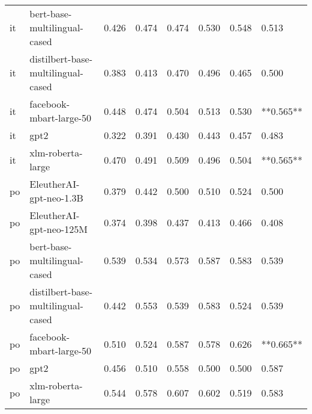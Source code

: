 \begin{tabular}{llllllll}
      it &       bert-base-multilingual-cased & 0.426 &                     0.474 &                 0.474 &                  0.530 &                                   0.548 &     0.513 \\
      it & distilbert-base-multilingual-cased & 0.383 &                     0.413 &                 0.470 &                  0.496 &                                   0.465 &     0.500 \\
      it &            facebook-mbart-large-50 & 0.448 &                     0.474 &                 0.504 &                  0.513 &                                   0.530 & **0.565** \\
      it &                               gpt2 & 0.322 &                     0.391 &                 0.430 &                  0.443 &                                   0.457 &     0.483 \\
      it &                  xlm-roberta-large & 0.470 &                     0.491 &                 0.509 &                  0.496 &                                   0.504 & **0.565** \\
      po &            EleutherAI-gpt-neo-1.3B & 0.379 &                     0.442 &                 0.500 &                  0.510 &                                   0.524 &     0.500 \\
      po &            EleutherAI-gpt-neo-125M & 0.374 &                     0.398 &                 0.437 &                  0.413 &                                   0.466 &     0.408 \\
      po &       bert-base-multilingual-cased & 0.539 &                     0.534 &                 0.573 &                  0.587 &                                   0.583 &     0.539 \\
      po & distilbert-base-multilingual-cased & 0.442 &                     0.553 &                 0.539 &                  0.583 &                                   0.524 &     0.539 \\
      po &            facebook-mbart-large-50 & 0.510 &                     0.524 &                 0.587 &                  0.578 &                                   0.626 & **0.665** \\
      po &                               gpt2 & 0.456 &                     0.510 &                 0.558 &                  0.500 &                                   0.500 &     0.587 \\
      po &                  xlm-roberta-large & 0.544 &                     0.578 &                 0.607 &                  0.602 &                                   0.519 &     0.583 \\

\end{tabular}
